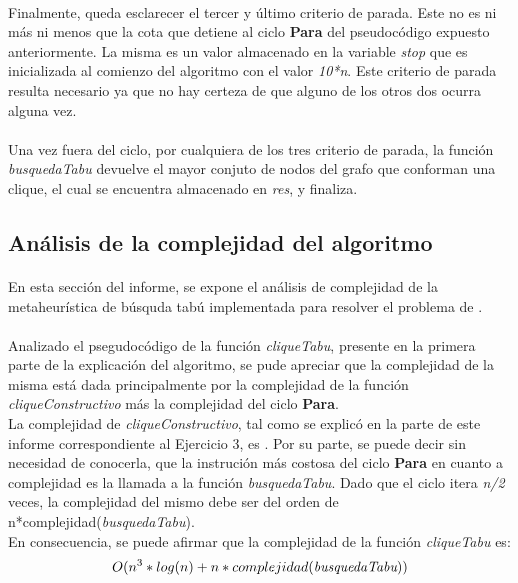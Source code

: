 \paragraph{}
Finalmente, queda esclarecer el tercer y último criterio de parada. Este no es ni más ni menos que la cota que detiene al ciclo \textbf{Para} del pseudocódigo expuesto anteriormente. La misma es un valor almacenado en la variable \textit{stop} que es inicializada al comienzo del algoritmo con el valor \textit{10*n}. Este criterio de parada resulta necesario ya que no hay certeza de que alguno de los otros dos ocurra alguna vez.
 
\paragraph{}
Una vez fuera del ciclo, por cualquiera de los tres criterio de parada, la función \textit{busquedaTabu} devuelve el mayor conjuto de nodos del grafo que conforman una clique, el cual se encuentra almacenado en \textit{res}, y finaliza.

\subsection{Análisis de la complejidad del algoritmo}
\label{compl5}

\paragraph{}
En esta sección del informe, se expone el análisis de complejidad de la metaheurística de búsquda tabú implementada para resolver el problema de \mc.

\paragraph{}
Analizado el psegudocódigo de la función \textit{cliqueTabu}, presente en la primera parte de la explicación del algoritmo, se pude apreciar que la complejidad de la misma está dada principalmente por la complejidad de la función \textit{cliqueConstructivo} más la complejidad del ciclo \textbf{Para}. \\
La complejidad de \textit{cliqueConstructivo}, tal como se explicó en la parte de este informe correspondiente al Ejercicio 3, es . Por su parte, se puede decir sin necesidad de conocerla, que la instrución más costosa del ciclo \textbf{Para} en cuanto a complejidad es la llamada a la función \textit{busquedaTabu}. Dado que el ciclo itera \textit{n/2} veces, la complejidad del mismo debe ser del orden de n*complejidad(\textit{busquedaTabu}). \\
En consecuencia, se puede afirmar que la complejidad de la función \textit{cliqueTabu} es: $$O(n^3*log(n) + n*complejidad(\textit{busquedaTabu}))$$

